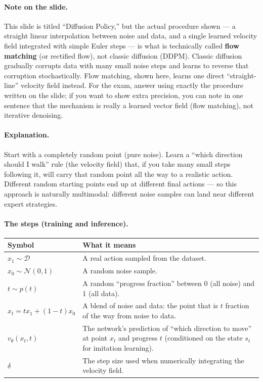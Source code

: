 \documentclass[11pt]{article}
\begin{document}
\paragraph{Note on the slide.}
This slide is titled ``Diffusion Policy,'' but the actual procedure shown --- a straight
linear interpolation between noise and data, and a single learned velocity field
integrated with simple Euler steps --- is what is technically called
\textbf{flow matching} (or rectified flow), not classic diffusion (DDPM). Classic
diffusion gradually corrupts data with many small noise steps and learns to reverse that
corruption stochastically. Flow matching, shown here, learns one direct ``straight-line''
velocity field instead. For the exam, answer using exactly the procedure written on the
slide; if you want to show extra precision, you can note in one sentence that the
mechanism is really a learned vector field (flow matching), not iterative denoising.

\paragraph{Explanation.}
Start with a completely random point (pure noise). Learn a ``which direction should I
walk'' rule (the velocity field) that, if you take many small steps following it, will
carry that random point all the way to a realistic action. Different random starting
points end up at different final actions --- so this approach is naturally multimodal:
different noise samples can land near different expert strategies.

\paragraph{The steps (training and inference).}

\begin{center}
\begin{tabular}{@{}p{3.2cm}p{10.3cm}@{}}
\toprule
Symbol & What it means \\
\midrule
$x_1 \sim \mathcal{D}$ & A real action sampled from the dataset. \\
$x_0 \sim \mathcal{N}(0,1)$ & A random noise sample. \\
$t \sim p(t)$ & A random ``progress fraction'' between 0 (all noise) and 1 (all data). \\
$x_t = t x_1 + (1-t) x_0$ & A blend of noise and data: the point that is $t$ fraction of
the way from noise to data. \\
$v_\theta(x_t,t)$ & The network's prediction of ``which direction to move'' at point
$x_t$ and progress $t$ (conditioned on the state $s_t$ for imitation learning). \\
$\delta$ & The step size used when numerically integrating the velocity field. \\
\bottomrule
\end{tabular}
\end{center}
\end{document}

